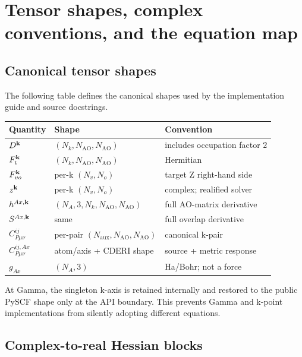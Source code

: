 \appendix
\section{Tensor shapes, complex conventions, and the equation map}
\label{sec:appendices}

\subsection{Canonical tensor shapes}

The following table defines the canonical shapes used by the implementation
guide and source docstrings.

\begin{center}
\begin{longtable}{p{}p{}p{}}
\toprule
Quantity & Shape & Convention \\
\midrule
$D^{\mathbf{k}}$ & $(N_k,N_{\mathrm{AO}},N_{\mathrm{AO}})$ & includes occupation factor $2$ \\
$F_{\mathrm t}^{\mathbf{k}}$ & $(N_k,N_{\mathrm{AO}},N_{\mathrm{AO}})$ & Hermitian \\
$F_{vo}^{\mathbf{k}}$ & per-k $(N_v,N_o)$ & target Z right-hand side \\
$z^{\mathbf{k}}$ & per-k $(N_v,N_o)$ & complex; realified solver \\
$h^{Ax,\mathbf{k}}$ & $(N_A,3,N_k,N_{\mathrm{AO}},N_{\mathrm{AO}})$ & full AO-matrix derivative \\
$S^{Ax,\mathbf{k}}$ & same & full overlap derivative \\
$C^{ij}_{P\mu\nu}$ & per-pair $(N_{\mathrm{aux}},N_{\mathrm{AO}},N_{\mathrm{AO}})$ & canonical k-pair \\
$C^{ij,Ax}_{P\mu\nu}$ & atom/axis + CDERI shape & source + metric response \\
$g_{Ax}$ & $(N_A,3)$ & Ha/Bohr; not a force \\
\bottomrule
\end{longtable}
\end{center}

At Gamma, the singleton k-axis is retained internally and restored to the
public PySCF shape only at the API boundary.  This prevents Gamma and k-point
implementations from silently adopting different equations.

\subsection{Complex-to-real Hessian blocks}

